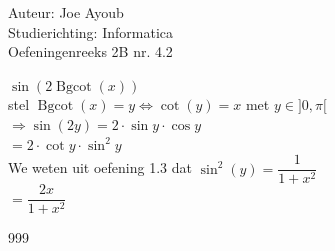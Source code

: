 \documentclass[a4paper]{article}
\newcommand{\Bgcot}{\operatorname{Bgcot}}
\begin{document}
\noindent \large Auteur: Joe Ayoub \\
\noindent \large Studierichting: Informatica\\
\noindent \large Oefeningenreeks 2B nr. 4.2\\

\medskip

\normalsize

$\sin(2\Bgcot(x))$ \\

stel $\Bgcot(x) = y \Leftrightarrow \cot(y) = x$ met $y \in ]0,\pi[$ \\

$\Rightarrow \sin(2y) = 2 \cdot \sin y \cdot \cos y$ \\

$ = 2 \cdot \cot y \cdot \sin^2 y$ \\

We weten uit oefening 1.3 dat $\sin^2(y) = \dfrac{1}{1+x^2}$ \\

$ = \dfrac{2x}{1 + x^2}$ \\

\begin{thebibliography}{999}

\end{thebibliography}
\end{document}
